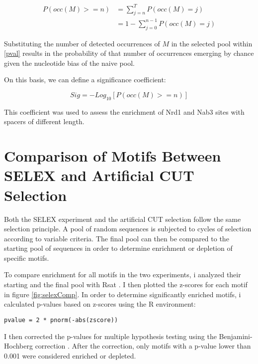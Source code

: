 \begin{equation} \label{pval}
\begin{split}
P(occ(M) >= n) & = \sum_{j=n}^{T}P(occ(M) = j)\\
& = 1-\sum_{j=0}^{n-1}P(occ(M) = j)
\end{split}
\end{equation}

Substituting the number of detected occurrences of $M$ in the selected pool  within \ref{pval} results in the probability of that number of occurrences emerging by chance given the nucleotide bias of the naive pool. 



On this basis, we can define a significance coefficient:

\begin{equation}
Sig = -Log_{10}[P(occ(M) >= n)]
\end{equation}

This coefficient was used to assess the enrichment of Nrd1 and Nab3 sites with spacers of different length.

\singlespacing
\section*{Comparison of Motifs Between SELEX and Artificial CUT Selection}
\doublespacing

Both the SELEX experiment and the artificial CUT selection follow the same selection principle. A pool of random sequences is subjected to cycles of selection according to variable criteria. The final pool can then be compared to the starting pool of sequences in order to determine enrichment or depletion of specific motifs. 

To compare enrichment for all motifs in the two experiments, i analyzed their starting and the final pool with Rsat \cite{medinarivera:2015:rsat}. I then plotted the z-scores for each motif in figure \ref{fig:selexComp}.
In order to determine significantly enriched motifs, i calculated p-values based on z-scores using the R environment:

\begin{verbatim}
pvalue = 2 * pnorm(-abs(zscore))
\end{verbatim}

I then corrected the p-values for multiple hypothesis testing using the Benjamini-Hochberg correction \cite{hochberg:1990:more}. After the correction, only motifs with a p-value lower than 0.001 were considered enriched or depleted.

